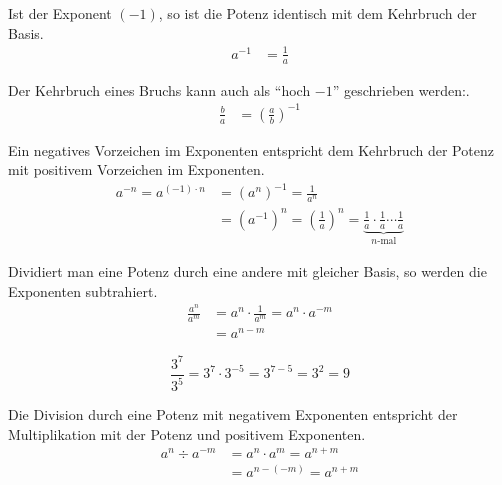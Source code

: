 \begin{defi}
Ist der Exponent \((-1)\), so ist die Potenz identisch mit dem Kehrbruch der Basis.
 \begin{align*}
  a^{-1} &= \frac{1}{a}
 \end{align*}
\end{defi}

\begin{beme}
 Der Kehrbruch eines Bruchs kann auch als "`hoch \(-1\)"' geschrieben werden:.
 \begin{align*}
  \frac{b}{a} &= \left(\frac{a}{b}\right)^{-1}
 \end{align*}

\end{beme}


\begin{folg}
Ein negatives Vorzeichen im Exponenten entspricht dem Kehrbruch der Potenz mit positivem Vorzeichen im Exponenten.
 \begin{align*}
  a^{-n} = a^{(-1)\cdot n} &= \left(a^n\right)^{-1} = \frac{1}{a^n}\\
  &= \left( a^{-1} \right)^n = \left(\frac{1}{a}\right)^n = \underbrace{\frac{1}{a}\cdot \frac{1}{a} \cdots \frac{1}{a}}_{n\text{-mal}}
 \end{align*}

\end{folg}

\begin{regel}
 Dividiert man eine Potenz durch eine andere mit gleicher Basis, so werden die Exponenten subtrahiert.
 \begin{align*}
  \frac{a^n}{a^m} &= a^n \cdot  \frac{1}{a^m} = a^n \cdot a^{-m}\\
   &= a^{n-m}
 \end{align*}
\end{regel}

\begin{bsp}
 \begin{equation*}
  \frac{3^7}{3^5} = 3^7 \cdot 3^{-5} = 3^{7-5} = 3^2 = 9
 \end{equation*}

\end{bsp}

\begin{folg}
 Die Division durch eine Potenz mit negativem Exponenten entspricht der Multiplikation mit der Potenz und positivem Exponenten.
 \begin{align*}
  a^n\div a^{-m} &= a^n \cdot a^m = a^{n+m} \\
  &= a^{n-(-m)} = a^{n+m}
 \end{align*}

\end{folg}

